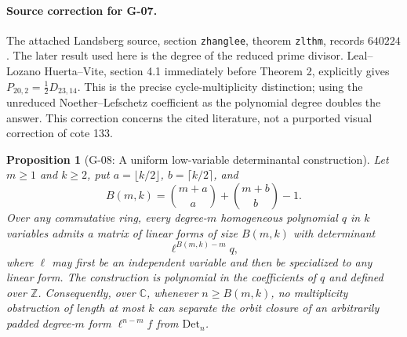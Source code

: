 \documentclass[11pt,a4paper]{article}
\newtheorem{proposition}{Proposition}
\theoremstyle{definition}\newtheorem{definition}{Definition}
\begin{document}
\paragraph{Source correction for G-07.}
The attached Landsberg source, section \texttt{zhanglee}, theorem \texttt{zlthm}, records $640224$. The later result used here is the degree of the reduced prime divisor. Leal--Lozano Huerta--Vite, section 4.1 immediately before Theorem 2, explicitly gives $P_{20,2}=\tfrac12D_{23,14}$. This is the precise cycle-multiplicity distinction; using the unreduced Noether--Lefschetz coefficient as the polynomial degree doubles the answer. This correction concerns the cited literature, not a purported visual correction of cote 133.

\begin{proposition}[G-08: A uniform low-variable determinantal construction]\label{G-08}
Let $m\geq1$ and $k\geq2$, put $a=\lfloor k/2\rfloor$, $b=\lceil k/2\rceil$, and
\[
 B(m,k)=\binom{m+a}{a}+\binom{m+b}{b}-1.
\]
Over any commutative ring, every degree-$m$ homogeneous polynomial $q$ in $k$ variables admits a matrix of linear forms of size $B(m,k)$ with determinant
\[
 \ell^{B(m,k)-m}q,
\]
where $\ell$ may first be an independent variable and then be specialized to any linear form. The construction is polynomial in the coefficients of $q$ and defined over $\mathbb Z$.
Consequently, over $\mathbb C$, whenever $n\geq B(m,k)$, no multiplicity obstruction of length at most $k$ can separate the orbit closure of an arbitrarily padded degree-$m$ form $\ell^{n-m}f$ from $\mathrm{Det}_n$.
\end{proposition}
\end{document}
